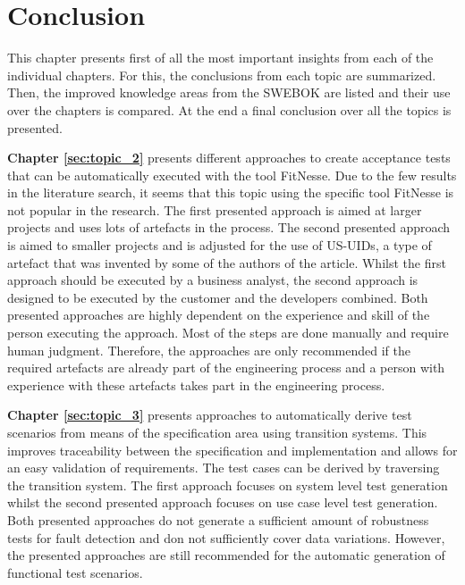 \chapter{Conclusion} \label{chap:conclusion}

This chapter presents first of all the most important insights from each of the individual chapters. For this, the conclusions from each topic are summarized. Then, the improved knowledge areas from the SWEBOK are listed and their use over the chapters is compared. At the end a final conclusion over all the topics is presented.

\textbf{Chapter \ref{sec:topic_2}} presents different approaches to create acceptance tests that can be automatically executed with the tool FitNesse. Due to the few results in the literature search, it seems that this topic using the specific tool FitNesse is not popular in the research. The first presented approach \cite{el-attar} is aimed at larger projects and uses lots of artefacts in the process. The second presented approach \cite{longo} is aimed to smaller projects and is adjusted for the use of US-UIDs, a type of artefact that was invented by some of the authors of the article. Whilst the first approach should be executed by a business analyst, the second approach is designed to be executed by the customer and the developers combined.  Both presented approaches are highly dependent on the experience and skill of the person executing the approach. Most of the steps are done manually and require human judgment. Therefore, the approaches are only recommended if the required artefacts are already part of the engineering process and a person with experience with these artefacts takes part in the engineering process.

\textbf{Chapter \ref{sec:topic_3}} presents approaches to automatically derive test scenarios from means of the specification area using transition systems. This improves traceability between the specification and implementation and allows for an easy validation of requirements. The test cases can be derived by traversing the transition system. The first approach \cite{ClementineNebut2006} focuses on system level test generation whilst the second presented approach \cite{NajlaRaza2007} focuses on use case level test generation. Both presented approaches do not generate a sufficient amount of robustness tests for fault detection and don not sufficiently cover data variations. However, the presented approaches are still recommended for the automatic generation of functional test scenarios.

